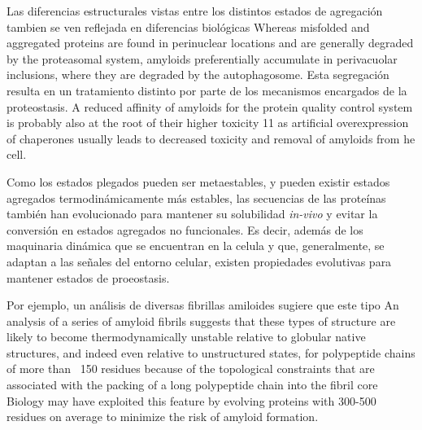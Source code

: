Las diferencias estructurales vistas entre los distintos estados de agregación tambien se ven reflejada en diferencias biológicas 
Whereas misfolded and aggregated proteins are found in perinuclear locations and are generally degraded by the 
proteasomal system, amyloids preferentially accumulate in perivacuolar inclusions, where they are degraded by the autophagosome.
Esta segregación resulta en un tratamiento distinto por parte de los mecanismos encargados de la proteostasis.
A reduced affinity of amyloids for the protein quality control system is probably also at the root of their higher toxicity 11 as artificial overexpression of chaperones
usually leads to decreased toxicity and removal of amyloids from he cell.




Como los estados plegados pueden ser metaestables, y pueden existir estados agregados termodinámicamente más estables, las secuencias de las proteínas también han evolucionado para mantener su solubilidad \textit{in-vivo}
y evitar la conversión en estados agregados no funcionales.
Es decir, además de los maquinaria dinámica que se encuentran en la celula y que, generalmente, se adaptan a las señales del entorno celular, existen propiedades evolutivas para mantener estados de proeostasis.

Por ejemplo, un análisis de diversas fibrillas amiloides  sugiere que este tipo 
An analysis of a series of amyloid fibrils suggests that these types of structure are likely to become thermodynamically unstable relative to globular native structures, and indeed even relative to unstructured states, for
polypeptide chains of more than ~150 residues because of the topological constraints that are associated with the
packing of a long polypeptide chain into the fibril core \cite{baldwin2011metastability}
Biology may have exploited this feature by evolving proteins with 300-500 residues on average to minimize the risk of amyloid formation. 

